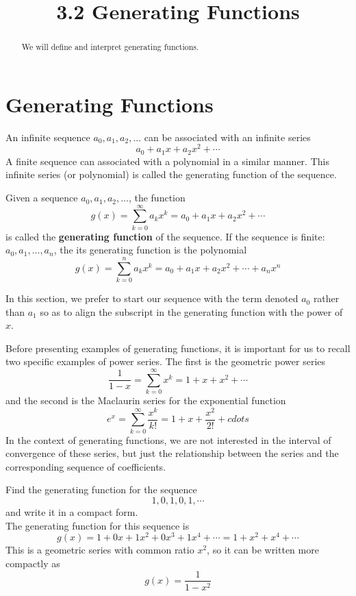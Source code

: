 \documentclass[handout]{ximera}
\title{3.2 Generating Functions}
\begin{document}
\begin{abstract}
We will define and interpret generating functions.
\end{abstract}

\maketitle

\section{Generating Functions}

An infinite sequence $a_0, a_1, a_2, ... $ can be associated with an infinite series
\[
a_0 + a_1 x + a_2 x^2 + \cdots
\]
A finite sequence can associated with a polynomial in a similar manner.
This infinite series (or polynomial) is called the generating function of the sequence.
\begin{definition}
Given a sequence $a_0, a_1, a_2, ...$, the function 
\[
g(x) = \sum_{k=0}^\infty a_kx^k = a_0 + a_1 x + a_2 x^2 + \cdots
\]
is called the \textbf{generating function} of the sequence.
If the sequence is finite: $a_0, a_1, ..., a_n$, the its generating function is the polynomial
\[
g(x) = \sum_{k=0}^n a_kx^k = a_0 + a_1 x + a_2 x^2 + \cdots + a_n x^n
\]
\end{definition}

\begin{remark}
In this section, we prefer to start our sequence with the term denoted $a_0$ rather than $a_1$ so as to 
align the subscript in the generating function with the power of $x$.
\end{remark}

Before presenting examples of generating functions, it is important for us to recall two specific examples of power series.
The first is the geometric power series
\[
\frac{1}{1-x} = \sum_{k=0}^\infty x^k = 1 + x + x^2 + \cdots
\]
and the second is the Maclaurin series for the exponential function
\[
e^x =  \sum_{k=0}^\infty \frac{x^k}{k!} = 1 + x + \frac{x^2}{2!} + cdots
\]
In the context of generating functions, we are not interested in the interval of convergence of these series, 
but just the relationship between
the series and the corresponding sequence of coefficients.

\begin{example}[example 1]
Find the generating function for the sequence 
\[
1, 0, 1, 0, 1, \cdots
\]
and write it in a compact form.\\
The generating function for this sequence is 
\[
g(x) = 1 + 0x + 1x^2 + 0x^3 + 1x^4 + \cdots = 1 + x^2 + x^4 + \cdots
\]
This is a geometric series with common ratio $x^2$, so it can be written more compactly as
\[
g(x) = \frac{1}{1 - x^2}
\]
\end{example}
\end{document}
